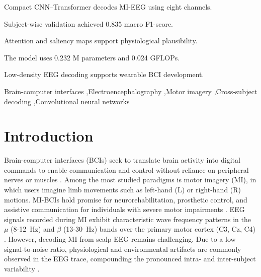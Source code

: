 \documentclass[a4paper,fleqn]{cas-dc}
\begin{document}
\begin{highlights}
\item Compact CNN–Transformer decodes MI-EEG using eight channels.
\item Subject-wise validation achieved 0.835 macro F1-score.
\item Attention and saliency maps support physiological plausibility.
\item The model uses 0.232 M parameters and 0.024 GFLOPs.
\item Low-density EEG decoding supports wearable BCI development.
\end{highlights}

\begin{keywords}
Brain-computer interfaces \sep Electroencephalography \sep Motor imagery \sep Cross-subject decoding \sep Convolutional neural networks
\end{keywords}

\maketitle

\section{Introduction}
\label{sec:introduction}

Brain-computer interfaces (BCIs) seek to translate brain activity into digital commands to enable communication and control without reliance on peripheral nerves or muscles \citep{1niedermeyer2005electroencephalography}. Among the most studied paradigms is motor imagery (MI), in which users imagine limb movements such as left-hand (L) or right-hand (R) motions. MI-BCIs hold promise for neurorehabilitation, prosthetic control, and assistive communication for individuals with severe motor impairments \citep{2pfurtscheller1999event,3schalk2004bci2000}. EEG signals recorded during MI exhibit characteristic wave frequency patterns in the $\mu$ (8-12~Hz) and $\beta$ (13-30~Hz) bands over the primary motor cortex (C3, Cz, C4) \citep{4pfurtscheller2001functional}. However, decoding MI from scalp EEG remains challenging. Due to a low signal-to-noise ratio, physiological and environmental artifacts are commonly observed in the EEG trace, compounding the pronounced intra- and inter-subject variability \citep{5physionet2009eeg,6dhiman2023ml_eeg_bci, SahaBaumert2020_IntraInterSubjectEEG}.
 
\end{document}
